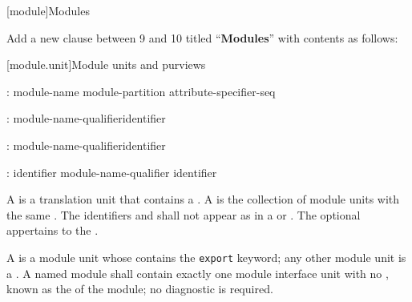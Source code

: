 \setcounter{chapter}{99}
[module]{Modules}%

\noindent
Add a new clause between 9 and 10 titled ``\textbf{Modules}'' with contents as follows:

[module.unit]{Module units and purviews}

\begin{std.txt}\color{addclr}
\begin{bnf}\color{addclr}
:\br
   \opt{}  module-name module-partition\opt{} attribute-specifier-seq\opt{} \terminal{;}
\end{bnf}
  
  \begin{bnf}\color{addclr}
    :\br
      module-name-qualifier\opt identifier
  \end{bnf}
  
  \begin{after}
  \begin{bnf}\color{addclr}
    :\br
      \terminal{:} module-name-qualifier\opt identifier
  \end{bnf}
  \end{after}
  
  \begin{bnf}\color{addclr}
    :\br
      identifier \br
      module-name-qualifier identifier 
  \end{bnf}
  
\pnum
A  is a translation unit that contains
a . A  is the
collection of module units with the same .
The identifiers  and 
shall not appear as 
in a  or .
The optional 
appertains to the .

\pnum
A  is a module unit whose
 contains the \texttt{export} keyword;
any other module unit is a .
A named module shall contain exactly one module interface unit
with no , known as the
 of the module;
no diagnostic is required.


\end{std.txt}
